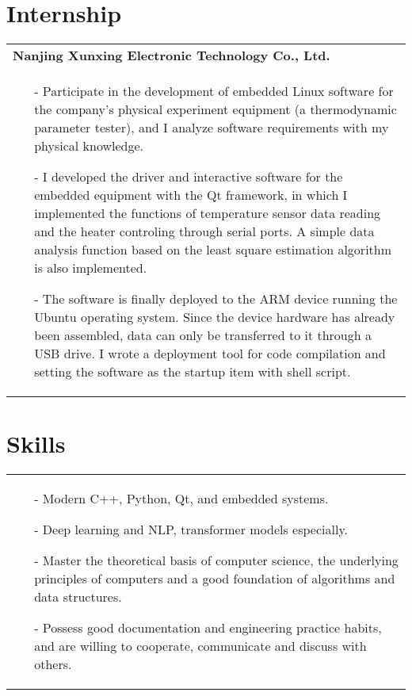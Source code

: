 \documentclass[a4paper,12pt]{article}
\newcommand{\signed}[1]{%
\unskip\nobreak\hfil\penalty50
   \hskip2em\hbox{}\nobreak\hfil#1
   \parfillskip=0pt \finalhyphendemerits=0 }
\begin{document}
\section{Internship}
\begin{tabularx}{\linewidth}{ @{}X@{} }
    \textbf{Nanjing Xunxing Electronic Technology Co., Ltd.}
    \signed{Jun. 2020 - Aug. 2020} \\[3.75pt]
    \begin{minipage}[t]{\linewidth}
        \begin{itemize}[nosep,after=\strut, leftmargin=1em, itemsep=3pt]
            \item[-] Participate in the development of embedded Linux software for the company's physical experiment equipment (a thermodynamic parameter tester), and I analyze software requirements with my physical knowledge.
            \item[-] I developed the driver and interactive software for the embedded equipment with the Qt framework, in which I implemented the functions of temperature sensor data reading and the heater controling through serial ports. A simple data analysis function based on the least square estimation algorithm is also implemented.
            \item[-] The software is finally deployed to the ARM device running the Ubuntu operating system. Since the device hardware has already been assembled, data can only be transferred to it through a USB drive. I wrote a deployment tool for code compilation and setting the software as the startup item with shell script.
        \end{itemize}
        \end{minipage}
\end{tabularx}
\section{Skills}
\begin{tabularx}{\linewidth}{@{}l}
\begin{minipage}[t]{\linewidth}
\begin{itemize}[nosep,after=\strut, leftmargin=1em, itemsep=3pt]
    \item[-] Modern C++, Python, Qt, and embedded systems.
    \item[-] Deep learning and NLP, transformer models especially.
    \item[-] Master the theoretical basis of computer science, the underlying principles of computers and a good foundation of algorithms and data structures.
    \item[-] Possess good documentation and engineering practice habits, and are willing to cooperate, communicate and discuss with others.
\end{itemize}
\end{minipage}
\end{tabularx}

\vfill
{}
\end{document}
